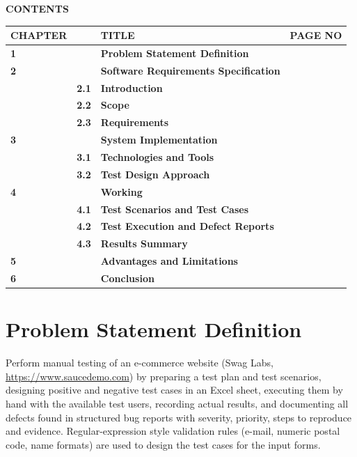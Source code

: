 \documentclass[12pt,a4paper]{article}
\begin{document}
\begin{center}{\large\bfseries CONTENTS}\end{center}
\vspace{0.3cm}
\renewcommand{\arraystretch}{1.6}
\begin{tabular}{|p{1.8cm}|p{1.2cm}|p{8cm}|p{2.2cm}|}
\hline
\textbf{CHAPTER} & & \textbf{TITLE} & \textbf{PAGE NO}\\ \hline
\textbf{1} & & \textbf{Problem Statement Definition} & \pageref{sec:ps}\\ \hline
\textbf{2} & & \textbf{Software Requirements Specification} & \pageref{sec:srs}\\ \hline
 & \textbf{2.1} & \textbf{Introduction} & \pageref{sec:srs1}\\ \hline
 & \textbf{2.2} & \textbf{Scope} & \pageref{sec:srs2}\\ \hline
 & \textbf{2.3} & \textbf{Requirements} & \pageref{sec:srs3}\\ \hline
\textbf{3} & & \textbf{System Implementation} & \pageref{sec:impl}\\ \hline
 & \textbf{3.1} & \textbf{Technologies and Tools} & \pageref{sec:impl1}\\ \hline
 & \textbf{3.2} & \textbf{Test Design Approach} & \pageref{sec:impl2}\\ \hline
\textbf{4} & & \textbf{Working} & \pageref{sec:work}\\ \hline
 & \textbf{4.1} & \textbf{Test Scenarios and Test Cases} & \pageref{sec:work1}\\ \hline
 & \textbf{4.2} & \textbf{Test Execution and Defect Reports} & \pageref{sec:work2}\\ \hline
 & \textbf{4.3} & \textbf{Results Summary} & \pageref{sec:work3}\\ \hline
\textbf{5} & & \textbf{Advantages and Limitations} & \pageref{sec:adv}\\ \hline
\textbf{6} & & \textbf{Conclusion} & \pageref{sec:concl}\\ \hline
\end{tabular}
\newpage

\section{Problem Statement Definition}\label{sec:ps}
Perform manual testing of an e-commerce website (Swag Labs, \url{https://www.saucedemo.com}) by preparing a test plan and test scenarios, designing positive and negative test cases in an Excel sheet, executing them by hand with the available test users, recording actual results, and documenting all defects found in structured bug reports with severity, priority, steps to reproduce and evidence. Regular-expression style validation rules (e-mail, numeric postal code, name formats) are used to design the test cases for the input forms.
\end{document}
